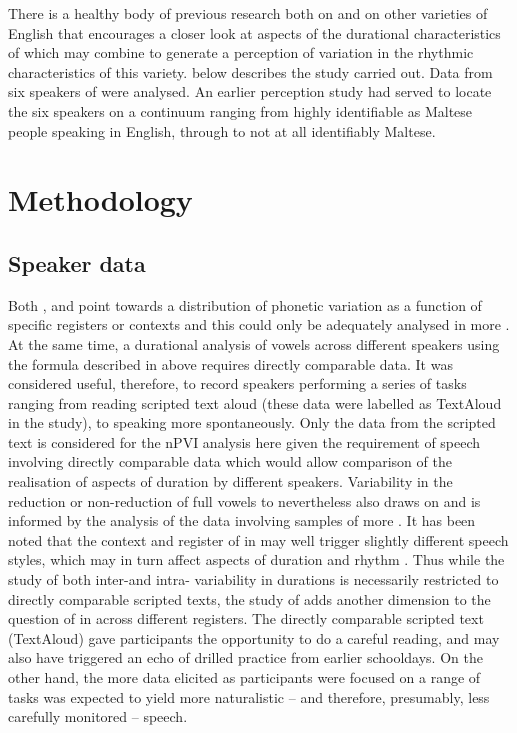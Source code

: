\documentclass[output=paper]{langsci/langscibook}
\begin{document}
There is a healthy body of previous research both on  and on other varieties of English that encourages a closer look at aspects of the durational characteristics of  which may combine to generate a perception of variation in the rhythmic characteristics of this variety.  below describes the study carried out. Data from six speakers of  were analysed. An earlier perception study \citep{Grech2015} had served to locate the six speakers on a continuum ranging from highly identifiable as Maltese people speaking in English, through to not at all identifiably Maltese. 

\section{Methodology}
\label{sec:key:grech3}
\subsection{Speaker data}
Both \citet{Vella1995}, and \citet{Bonnici2010} point towards a distribution of phonetic variation as a function of specific registers or contexts and this could only be adequately analysed in more . At the same time, a durational analysis of vowels across different speakers using the formula described in  above requires directly comparable data. It was considered useful, therefore, to record speakers performing a series of tasks ranging from reading scripted text aloud (these data were labelled as {\textquotedbl}TextAloud{\textquotedbl} in the study), to speaking more spontaneously. Only the data from the scripted text is considered for the nPVI analysis here given the requirement of speech involving directly comparable data which would allow comparison of the realisation of aspects of duration by different  speakers. Variability in the reduction or non-reduction of full vowels to  nevertheless also draws on and is informed by the analysis of the data involving samples of more . It has been noted that the context and register of  in  may well trigger slightly different speech styles, which may in turn affect aspects of duration and rhythm \cite{Vella1995}. Thus while the study of both inter-and intra- variability in  durations is necessarily restricted to directly comparable scripted texts, the study of  adds another dimension to the question of  in  across different registers. The directly comparable scripted text (TextAloud) gave participants the opportunity to do a careful reading, and may also have triggered an echo of drilled  practice from earlier schooldays. On the other hand, the more  data elicited as participants were focused on a range of tasks was expected to yield more naturalistic – and therefore, presumably, less carefully monitored – speech. 
\end{document}
